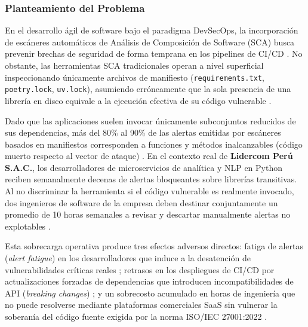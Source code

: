 \subsubsection{Planteamiento del Problema}
En el desarrollo ágil de software bajo el paradigma DevSecOps, la incorporación de escáneres automáticos de Análisis de Composición de Software (SCA) busca prevenir brechas de seguridad de forma temprana en los pipelines de CI/CD \parencite{humble2010continuous, coila2023devsecops}. %
No obstante, las herramientas SCA tradicionales operan a nivel superficial inspeccionando únicamente archivos de manifiesto (\texttt{requirements.txt}, \texttt{poetry.lock}, \texttt{uv.lock}), asumiendo erróneamente que la sola presencia de una librería en disco equivale a la ejecución efectiva de su código vulnerable \parencite{pashchenko2022vuln4real, dann2021identifying}. %

Dado que las aplicaciones suelen invocar únicamente subconjuntos reducidos de sus dependencias, más del 80\% al 90\% de las alertas emitidas por escáneres basados en manifiestos corresponden a funciones y métodos inalcanzables (código muerto respecto al vector de ataque) \parencite{pashchenko2022vuln4real, ponta2020detection}. %
En el contexto real de \textbf{Lidercom Perú S.A.C.}, los desarrolladores de microservicios de analítica y NLP en Python reciben semanalmente decenas de alertas bloqueantes sobre librerías transitivas. %
Al no discriminar la herramienta si el código vulnerable es realmente invocado, dos ingenieros de software de la empresa deben destinar conjuntamente un promedio de 10 horas semanales a revisar y descartar manualmente alertas no explotables \parencite{sadowski2018lessons}. %

Esta sobrecarga operativa produce tres efectos adversos directos: fatiga de alertas (\textit{alert fatigue}) en los desarrolladores que induce a la desatención de vulnerabilidades críticas reales \parencite{johnson2013developers}; %
retrasos en los despliegues de CI/CD por actualizaciones forzadas de dependencias que introducen incompatibilidades de API (\textit{breaking changes}) \parencite{bogart2016break, fowler2018refactoring}; %
y un sobrecosto acumulado en horas de ingeniería que no puede resolverse mediante plataformas comerciales SaaS sin vulnerar la soberanía del código fuente exigida por la norma ISO/IEC 27001:2022 \parencite{ladisa2023sok, gutierrez2024auditoria}. %

\newpage

